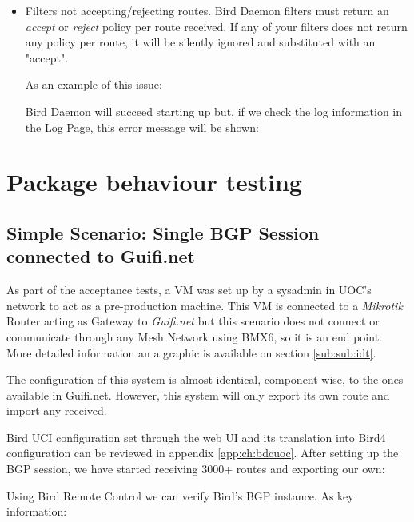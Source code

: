 \begin{itemize}
\item Filters not accepting/rejecting routes.
Bird Daemon filters must return an \textit{accept} or \textit{reject} policy per route received. If any of your filters does not return any policy per route, it will be silently ignored and substituted with an "accept".

As an example of this issue:


Bird Daemon will succeed starting up but, if we check the log information in the Log Page, this error message will be shown:


\end{itemize}


\section{Package behaviour testing} 
\subsection{Simple Scenario: Single BGP Session connected to Guifi.net}
As part of the acceptance tests, a VM was set up by a sysadmin in UOC's network to act as a pre-production machine. This VM is connected to a \textit{Mikrotik} Router acting as Gateway to \textit{Guifi.net} but this scenario does not connect or communicate through any Mesh Network using BMX6, so it is an end point. More detailed information an a graphic is available on section \ref{sub:sub:idt}.

The configuration of this system is almost identical, component-wise, to the ones available in Guifi.net. However, this system will only export its own route and import any received.

Bird UCI configuration set through the web UI and its translation into Bird4 configuration can be reviewed in appendix \ref{app:ch:bdcuoc}. After setting up the BGP session, we have started receiving 3000+ routes and exporting our own:



Using Bird Remote Control we can verify Bird's BGP instance. As key information:

